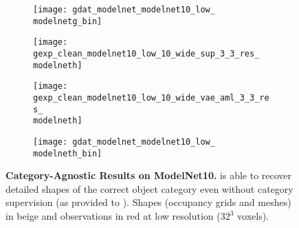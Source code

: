 \begin{figure}[t!]
{\begin{subfigure}[t]{0.07\textwidth}
    \end{subfigure}
    \begin{subfigure}[t]{0.07\textwidth}
        \vspace{0px}\centering
        \texttt{[image: gdat\_modelnet\_modelnet10\_low\_\\modelnetg\_bin]}
    \end{subfigure}\begin{subfigure}[t]{0.07\textwidth}
        \vspace{0px}\centering
        \texttt{[image: gexp\_clean\_modelnet10\_low\_10\_wide\_sup\_3\_3\_res\_\\modelneth]}
    \end{subfigure}
    \begin{subfigure}[t]{0.07\textwidth}
        \vspace{0px}\centering
        \texttt{[image: gexp\_clean\_modelnet10\_low\_10\_wide\_vae\_aml\_3\_3\_res\_\\modelneth]}
    \end{subfigure}
    \begin{subfigure}[t]{0.07\textwidth}
        \vspace{0px}\centering
        \texttt{[image: gdat\_modelnet\_modelnet10\_low\_\\modelneth\_bin]}
    \end{subfigure}
    }
    \vspace*{-\figskipcaption px}
    \caption{{\bf Category-Agnostic Results on ModelNet10.} \AML is able to recover detailed shapes of the correct object category even without category supervision (as provided to \Dai). Shapes (occupancy grids and meshes) in {\color{rbeige}beige} and observations in {\color{rred}red} at low resolution ($32^3$ voxels).}
    \label{fig:results-modelnet-extra-a}
    \vspace*{-\figskipbelow px}
\end{figure}